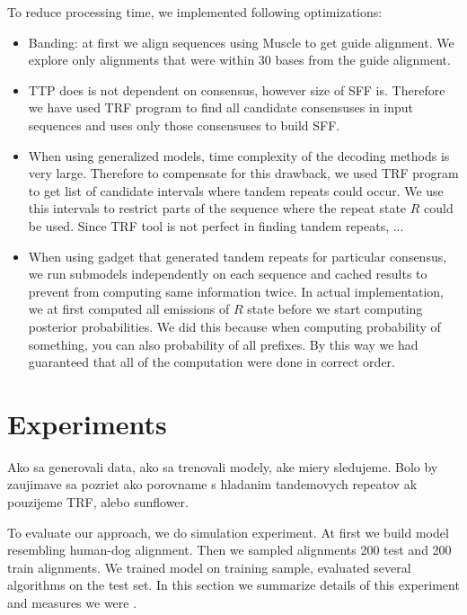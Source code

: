 To reduce processing time, we implemented following optimizations:
\begin{itemize}[itemsep=-1mm]
\item Banding: at first we align sequences using Muscle\cite{} to get guide
alignment. We explore only alignments that were within 30 bases from the guide
alignment.

\item TTP does is not dependent on consensus, however size of SFF is. Therefore
we have used TRF program to find all candidate consensuses in input sequences
and uses only those consensuses to build SFF.

\item When using generalized models, time complexity of the decoding methods is
very large.  Therefore to compensate for this drawback, we used TRF program to
get list of candidate intervals where tandem repeats could occur. We use this
intervals to restrict parts of the sequence where the repeat state $R$ could be
used. Since TRF tool is not perfect in finding tandem repeats, ...

\item When using gadget that generated tandem repeats for particular consensus,
we run submodels independently on each sequence and cached results to prevent
from computing same information twice. In actual implementation, we at first
computed all emissions of $R$ state before we start computing posterior
probabilities. We did this because when computing probability of something, you
can also probability of all prefixes.  By this way we had guaranteed that all
of the computation were done in correct order.

\end{itemize}

\section{Experiments}
\begin{reformulate*}
Ako sa generovali data, ako sa trenovali modely, ake miery sledujeme.  Bolo by
zaujimave sa pozriet ako porovname s hladanim tandemovych repeatov ak pouzijeme
TRF, alebo sunflower.

\end{reformulate*}

To evaluate our approach, we do simulation experiment. At first we build model
resembling human-dog alignment. Then we sampled alignments 200 test and 200
train alignments. We trained model on training sample, evaluated several algorithms
on the test set. In this section we summarize details of this experiment and 
measures we were .



